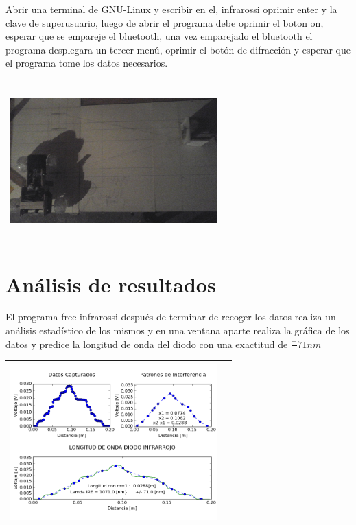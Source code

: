 \documentclass[12]{article}
\newenvironment{Figure}
{\par\medskip\noindent\minipage{\linewidth}}
{\endminipage\par\medskip}
\begin{document}
\begin{multicols}{2}
Abrir una terminal de GNU-Linux y escribir en el, infrarossi oprimir enter y la clave de superusuario, luego de abrir el programa debe oprimir el boton on, esperar que se empareje el bluetooth, una vez emparejado el bluetooth el programa desplegara un tercer menú, oprimir el botón de difracción y esperar que el programa tome los datos necesarios.
\begin{Figure}	
\center
\begin{tabular}{|l|r|}
\hline
\includegraphics[width=8cm, height=6cm]{img/mon_difraccion.png} \\ \hline
\end{tabular}
\label{fig:g1}
\end{Figure}

\section{Análisis de resultados}
El programa free infrarossi después de terminar de recoger los datos realiza un análisis estadístico de los mismos y en una ventana aparte realiza la gráfica de los datos y predice la longitud de onda del diodo con una exactitud de $\frac{+}{-} 71 nm$
\begin{Figure}	
\center
\begin{tabular}{|l|r|}
\hline
\includegraphics[width=8cm, height=6cm]{img/Graficas.png} \\ \hline
\end{tabular}
\label{fig:g1}
\end{Figure}


\end{multicols}
\end{document}
